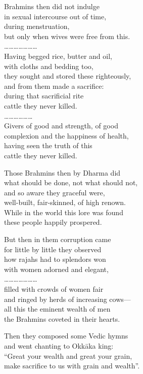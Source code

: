 \begin{myquote}
Brahmins then did not indulge\\ in sexual intercourse out of time,\\ during menstruation,\\ but only when wives were free from this.\\ …………………\\ Having begged rice, butter and oil,\\ with cloths and bedding too,\\ they sought and stored these righteously,\\ and from them made a sacrifice:\\ during that sacrificial rite\\ cattle they never killed.\\ ………………\\ Givers of good and strength, of good\\ complexion and the happiness of health,\\ having seen the truth of this\\ cattle they never killed.

Those Brahmins then by Dharma did\\ what should be done, not what should not,\\ and so aware they graceful were,\\ well-built, fair-skinned, of high renown.\\ While in the world this lore was found\\ these people happily prospered.

But then in them corruption came\\ for little by little they observed\\ how rajahs had to splendors won\\ with women adorned and elegant,\\ …………………\\ filled with crowds of women fair\\ and ringed by herds of increasing cows—\\ all this the eminent wealth of men\\ the Brahmins coveted in their hearts.

Then they composed some Vedic hymns\\ and went chanting to Okkāka king:\\ “Great your wealth and great your grain,\\ make sacrifice to us with grain and wealth”.


\end{myquote}
